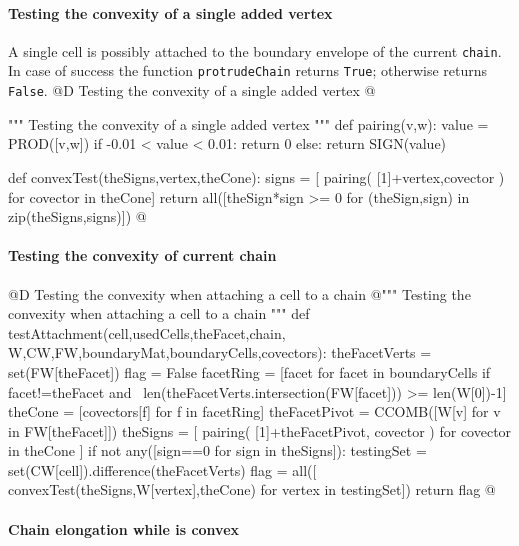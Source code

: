 \documentclass[11pt,oneside]{article}	%
\begin{document}
\paragraph{Testing the convexity of a single added vertex}
A single cell is possibly attached to the boundary envelope of the current \texttt{chain}. In case of success
the function \texttt{protrudeChain} returns \texttt{True}; otherwise returns \texttt{False}. 
@D Testing the convexity of a single added vertex
@{""" Testing the convexity of a single added vertex """
def pairing(v,w):
	value = PROD([v,w])
	if -0.01 < value < 0.01: return 0
	else: return SIGN(value)

def convexTest(theSigns,vertex,theCone):
	signs = [ pairing( [1]+vertex,covector ) for covector in theCone]
	return all([theSign*sign >= 0 for (theSign,sign) in zip(theSigns,signs)])
@}

\paragraph{Testing the convexity of current chain}
@D Testing the convexity when attaching a cell to a chain
@{""" Testing the convexity when attaching a cell to a chain """
def testAttachment(cell,usedCells,theFacet,chain,
					W,CW,FW,boundaryMat,boundaryCells,covectors):
	theFacetVerts = set(FW[theFacet])
	flag = False
	facetRing = [facet for facet in boundaryCells if facet!=theFacet and \
				 len(theFacetVerts.intersection(FW[facet])) >= len(W[0])-1]
	theCone = [covectors[f] for f in facetRing]
	theFacetPivot = CCOMB([W[v] for v in FW[theFacet]])
	theSigns = [ pairing( [1]+theFacetPivot, covector ) for covector in theCone ]
	if not any([sign==0 for sign in theSigns]):
		testingSet = set(CW[cell]).difference(theFacetVerts)
		flag = all([ convexTest(theSigns,W[vertex],theCone) for vertex in testingSet])
	return flag
@}

\paragraph{Chain elongation while is convex}
\end{document}
